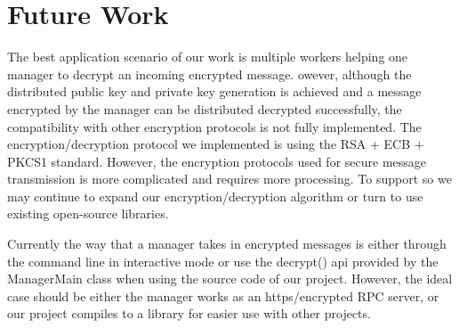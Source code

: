 \chapter{Future Work}

The best application scenario of our work is multiple workers helping one manager to decrypt an incoming encrypted message. owever, although the distributed public key and private key generation is achieved and a message encrypted by the manager can be distributed decrypted successfully, the compatibility with other encryption protocols is not fully implemented. The encryption/decryption protocol we implemented is using the RSA + ECB + PKCS1 standard. However, the encryption protocols used for secure message transmission is more complicated and requires more processing. To support so we may continue to expand our encryption/decryption algorithm or turn to use existing open-source libraries.

Currently the way that a manager takes in encrypted messages is either through the
command line in interactive mode or use the decrypt() api provided by the ManagerMain class when using the source code of our project. However, the ideal case should be either the manager works as an https/encrypted RPC server, or our project compiles to a library for easier use with other projects.
